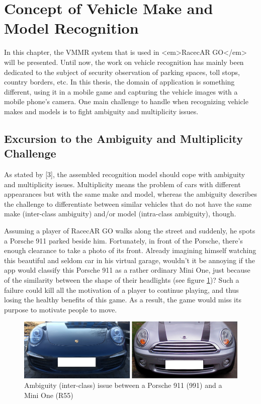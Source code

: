 \section{Concept of Vehicle Make and Model Recognition}\label{sec:vmmrConcept}
In this chapter, the VMMR system that is used in <em>RacecAR GO</em> will be presented. Until now, the work on vehicle recognition has mainly been dedicated to the subject of security observation of parking spaces, toll stops, country borders, etc. In this thesis, the domain of application is something different, using it in a mobile game and capturing the vehicle images with a mobile phone's camera. One main challenge to handle when recognizing vehicle makes and models is to fight ambiguity and multiplicity issues.

\subsection{Excursion to the Ambiguity and Multiplicity Challenge}
As stated by [3], the assembled recognition model should cope with ambiguity and multiplicity issues. Multiplicity means the problem of cars with different appearances but with the same make and model, whereas the ambiguity describes the challenge to differentiate between similar vehicles that do not have the same make (inter-class ambiguity) and/or model (intra-class ambiguity), though.

Assuming a player of RacecAR GO walks along the street and suddenly, he spots a Porsche 911 parked beside him. Fortunately, in front of the Porsche, there's enough clearance to take a photo of its front. Already imagining himself watching this beautiful and seldom car in his virtual garage, wouldn't it be annoying if the app would classify this Porsche 911 as a rather ordinary Mini One, just because of the similarity between the shape of their headlights (see figure \ref{fig:ambiguityPorsche})? Such a failure could kill all the motivation of a player to continue playing, and thus losing the healthy benefits of this game. As a result, the game would miss its purpose to motivate people to move.

\begin{figure}[bth]
  \centering
        \includegraphics[width=.75\linewidth]{gfx/ambiguity_porsche_911_mini}
        \caption{Ambiguity (inter-class) issue between a Porsche 911 (991) and a Mini One (R55)}
        \label{fig:ambiguityPorsche}
\end{figure}

